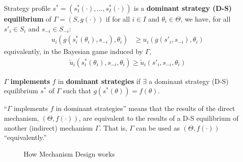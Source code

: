 \documentclass[11pt]{elegantbook_2}
\begin{document}
\begin{definition}
    Strategy profile $s^*=(s_1^*(\cdot),...,s_I^*(\cdot))$ is a \textbf{dominant strategy (D-S) equilibrium} of $\Gamma=(S,g(\cdot))$ if for all $i\in I$ and $\theta_i\in \Theta$, we have, for all $s'_i\in S_i$ and $s_{-i}\in S_{-i}$:
    \begin{equation}
        \begin{aligned}
            u_i(g(s_i^*(\theta_i),s_{-i}),\theta_i)&\geq u_i(g(s'_i,s_{-i}),\theta_i)
        \end{aligned}
        \nonumber
    \end{equation}
    equivalently, in the Bayesian game induced by $\Gamma$,
    \begin{equation}
        \begin{aligned}
            \tilde{u}_i(s_i^*(\theta_i),s_{-i},\theta_i)\geq \tilde{u}_i(s'_i,s_{-i},\theta_i)
        \end{aligned}
        \nonumber
    \end{equation}
\end{definition}

\begin{definition}
    $\Gamma$ \textbf{implements} $f$ in \textbf{dominant strategies} if $\exists$ a dominant strategy (D-S) equilibrium $s^*$ of $\Gamma$ such that $g(s^*(\theta))=f(\theta)$.
\end{definition}
``$\Gamma$ implements $f$ in dominant strategies'' means that the results of the direct mechanism, $(\Theta,f(\cdot))$, are equivalent to the results of a D-S equilibrium of another (indirect) mechanism $\Gamma$. That is, $\Gamma$ can be used as $(\Theta,f(\cdot))$ ``equivalently.''
\begin{center}\begin{figure}[htbp]
    \centering
    \caption{How Mechanism Design works}
    \label{}
\end{figure}\end{center}
\end{document}

